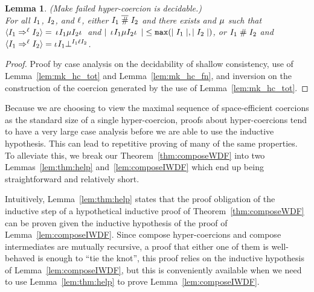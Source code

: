 \documentclass[acmtog, authorversion, acmlarge]{acmart}
\newtheorem{lem}{Lemma}
\begin{document}
\begin{lem}
  \label{lem:mk_hc_dec}
  (Make failed hyper-coercion is decidable.)\\
  For all $I_1$, $I_2$, and $\ell$,
  either $I_1 \; \overline{\#} \; I_2$ and there exists and $\mu$
  such that $\langle I_1 \Rightarrow^{\ell} I_2 \rangle = \, \iota_{} I_1 \mu I_2 \iota_{} \,$
  and $\mid \, \iota_{} I_1 \mu I_2 \iota_{} \, \mid \;
  \le \texttt{max}(\mid I_1 \mid, \mid I_2 \mid)$,
  or $I_1 \; \# \; I_2$ and
  $\langle I_1 \Rightarrow^{\ell} I_2 \rangle = \iota_{} I_1 \bot^{I_1 \ell I_2}$.
\end{lem}
\begin{proof}
  Proof by case analysis on the decidability of shallow consistency,
  use of Lemma~\ref{lem:mk_hc_tot} and Lemma~\ref{lem:mk_hc_fn}, and
  inversion on the construction of the coercion generated by the
  use of Lemma~\ref{lem:mk_hc_tot}. 
\end{proof}

Because we are choosing to view the maximal sequence of
space-efficient coercions as the standard size of a single hyper-coercion,
proofs about hyper-coercions tend to have a very large case analysis
before we are able to use the inductive hypothesis. This can
lead to repetitive proving of many of the same properties. To
alleviate this, we break our Theorem~\ref{thm:composeWDF} into two
Lemmas~\ref{lem:thm:help} and~\ref{lem:composeIWDF} which end up being straightforward and relatively short.

Intuitively, Lemma~\ref{lem:thm:help} states that the proof obligation
of the inductive step of a hypothetical inductive proof of
Theorem~\ref{thm:composeWDF} can be proven given the inductive
hypothesis of the proof of Lemma~\ref{lem:composeIWDF}. Since compose
hyper-coercions and compose intermediates are mutually recursive, a
proof that either one of them is well-behaved is enough to ``tie the
knot'', this proof relies on the inductive hypothesis of
Lemma~\ref{lem:composeIWDF}, but this is conveniently available when
we need to use Lemma~\ref{lem:thm:help} to prove
Lemma~\ref{lem:composeIWDF}.

\pagebreak
\end{document}
